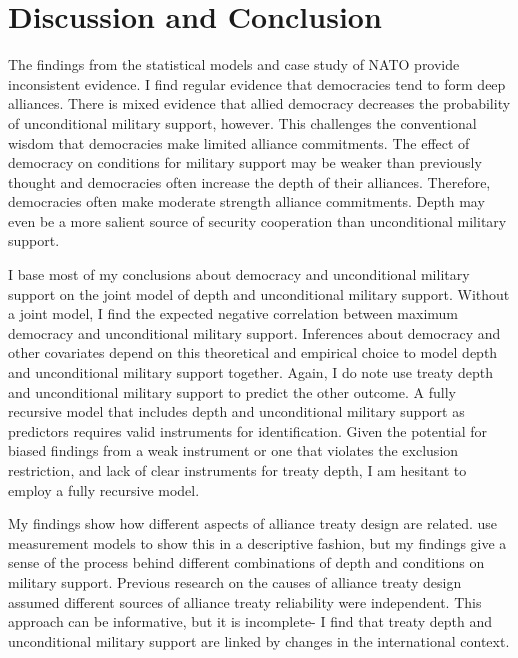 \documentclass[12pt]{article}
\begin{document}
\section{Discussion and Conclusion}


The findings from the statistical models and case study of NATO provide inconsistent evidence. 
I find regular evidence that democracies tend to form deep alliances.
There is mixed evidence that allied democracy decreases the probability of unconditional military support, however. 
This challenges the conventional wisdom that democracies make limited alliance commitments.
The effect of democracy on conditions for military support may be weaker than previously thought and democracies often increase the depth of their alliances. 
Therefore, democracies often make moderate strength alliance commitments. 
Depth may even be a more salient source of security cooperation than unconditional military support. 


I base most of my conclusions about democracy and unconditional military support on the joint model of depth and unconditional military support.
Without a joint model, I find the expected negative correlation between maximum democracy and unconditional military support.  
Inferences about democracy and other covariates depend on this theoretical and empirical choice to model depth and unconditional military support together. 
Again, I do note use treaty depth and unconditional military support to predict the other outcome. 
A fully recursive model that includes depth and unconditional military support as predictors requires valid instruments for identification.
Given the potential for biased findings from a weak instrument or one that violates the exclusion restriction, and lack of clear instruments for treaty depth, I am hesitant to employ a fully recursive model.  


My findings show how different aspects of alliance treaty design are related. 
\citet{BensonClinton2016} use measurement models to show this in a descriptive fashion, but my findings give a sense of the process behind different combinations of depth and conditions on military support. 
Previous research on the causes of alliance treaty design \citep{Benson2012, Mattes2012, Chibaetal2015} assumed different sources of alliance treaty reliability were independent. 
This approach can be informative, but it is incomplete- I find that treaty depth and unconditional military support are linked by changes in the international context. 
\end{document}
